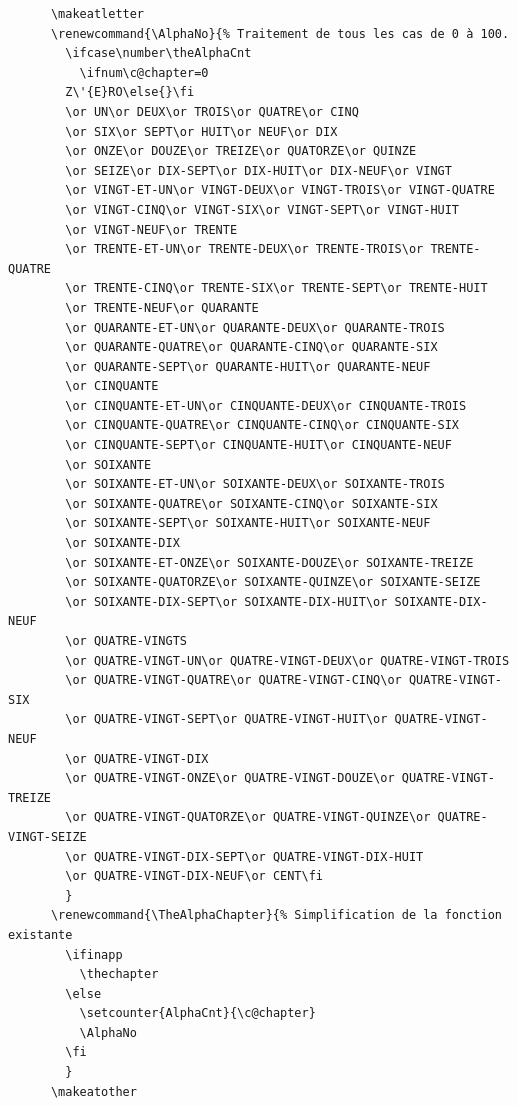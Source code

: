 \documentclass{report}
\begin{document}
    \begin{verbatim}
      \makeatletter
      \renewcommand{\AlphaNo}{% Traitement de tous les cas de 0 à 100.
        \ifcase\number\theAlphaCnt
          \ifnum\c@chapter=0
        Z\'{E}RO\else{}\fi
        \or UN\or DEUX\or TROIS\or QUATRE\or CINQ
        \or SIX\or SEPT\or HUIT\or NEUF\or DIX
        \or ONZE\or DOUZE\or TREIZE\or QUATORZE\or QUINZE
        \or SEIZE\or DIX-SEPT\or DIX-HUIT\or DIX-NEUF\or VINGT
        \or VINGT-ET-UN\or VINGT-DEUX\or VINGT-TROIS\or VINGT-QUATRE
        \or VINGT-CINQ\or VINGT-SIX\or VINGT-SEPT\or VINGT-HUIT
        \or VINGT-NEUF\or TRENTE
        \or TRENTE-ET-UN\or TRENTE-DEUX\or TRENTE-TROIS\or TRENTE-QUATRE
        \or TRENTE-CINQ\or TRENTE-SIX\or TRENTE-SEPT\or TRENTE-HUIT
        \or TRENTE-NEUF\or QUARANTE
        \or QUARANTE-ET-UN\or QUARANTE-DEUX\or QUARANTE-TROIS
        \or QUARANTE-QUATRE\or QUARANTE-CINQ\or QUARANTE-SIX
        \or QUARANTE-SEPT\or QUARANTE-HUIT\or QUARANTE-NEUF
        \or CINQUANTE
        \or CINQUANTE-ET-UN\or CINQUANTE-DEUX\or CINQUANTE-TROIS
        \or CINQUANTE-QUATRE\or CINQUANTE-CINQ\or CINQUANTE-SIX
        \or CINQUANTE-SEPT\or CINQUANTE-HUIT\or CINQUANTE-NEUF
        \or SOIXANTE
        \or SOIXANTE-ET-UN\or SOIXANTE-DEUX\or SOIXANTE-TROIS
        \or SOIXANTE-QUATRE\or SOIXANTE-CINQ\or SOIXANTE-SIX
        \or SOIXANTE-SEPT\or SOIXANTE-HUIT\or SOIXANTE-NEUF
        \or SOIXANTE-DIX
        \or SOIXANTE-ET-ONZE\or SOIXANTE-DOUZE\or SOIXANTE-TREIZE
        \or SOIXANTE-QUATORZE\or SOIXANTE-QUINZE\or SOIXANTE-SEIZE
        \or SOIXANTE-DIX-SEPT\or SOIXANTE-DIX-HUIT\or SOIXANTE-DIX-NEUF
        \or QUATRE-VINGTS
        \or QUATRE-VINGT-UN\or QUATRE-VINGT-DEUX\or QUATRE-VINGT-TROIS
        \or QUATRE-VINGT-QUATRE\or QUATRE-VINGT-CINQ\or QUATRE-VINGT-SIX
        \or QUATRE-VINGT-SEPT\or QUATRE-VINGT-HUIT\or QUATRE-VINGT-NEUF
        \or QUATRE-VINGT-DIX
        \or QUATRE-VINGT-ONZE\or QUATRE-VINGT-DOUZE\or QUATRE-VINGT-TREIZE
        \or QUATRE-VINGT-QUATORZE\or QUATRE-VINGT-QUINZE\or QUATRE-VINGT-SEIZE
        \or QUATRE-VINGT-DIX-SEPT\or QUATRE-VINGT-DIX-HUIT
        \or QUATRE-VINGT-DIX-NEUF\or CENT\fi
        }  
      \renewcommand{\TheAlphaChapter}{% Simplification de la fonction existante
        \ifinapp 
          \thechapter
        \else
          \setcounter{AlphaCnt}{\c@chapter}
          \AlphaNo
        \fi
        }  
      \makeatother
    \end{verbatim}
\end{document}
